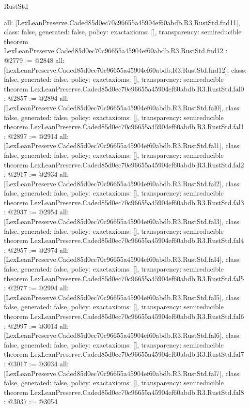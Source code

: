 \begin{lexlean}{RustStd}
\begin{coremodule}
{  all: [LexLeanPreserve.Caded85d0ec70c96655a45904ef60abdb.R3.RustStd.fnd11],
  class: false,
  generated: false,
  policy: exact{axioms: []},
  transparency: semireducible
}
theorem LexLeanPreserve.Caded85d0ec70c96655a45904ef60abdb.R3.RustStd.fnd12 : @2779 := @2848 {
  all: [LexLeanPreserve.Caded85d0ec70c96655a45904ef60abdb.R3.RustStd.fnd12],
  class: false,
  generated: false,
  policy: exact{axioms: []},
  transparency: semireducible
}
theorem LexLeanPreserve.Caded85d0ec70c96655a45904ef60abdb.R3.RustStd.fal0 : @2857 := @2894 {
  all: [LexLeanPreserve.Caded85d0ec70c96655a45904ef60abdb.R3.RustStd.fal0],
  class: false,
  generated: false,
  policy: exact{axioms: []},
  transparency: semireducible
}
theorem LexLeanPreserve.Caded85d0ec70c96655a45904ef60abdb.R3.RustStd.fal1 : @2897 := @2914 {
  all: [LexLeanPreserve.Caded85d0ec70c96655a45904ef60abdb.R3.RustStd.fal1],
  class: false,
  generated: false,
  policy: exact{axioms: []},
  transparency: semireducible
}
theorem LexLeanPreserve.Caded85d0ec70c96655a45904ef60abdb.R3.RustStd.fal2 : @2917 := @2934 {
  all: [LexLeanPreserve.Caded85d0ec70c96655a45904ef60abdb.R3.RustStd.fal2],
  class: false,
  generated: false,
  policy: exact{axioms: []},
  transparency: semireducible
}
theorem LexLeanPreserve.Caded85d0ec70c96655a45904ef60abdb.R3.RustStd.fal3 : @2937 := @2954 {
  all: [LexLeanPreserve.Caded85d0ec70c96655a45904ef60abdb.R3.RustStd.fal3],
  class: false,
  generated: false,
  policy: exact{axioms: []},
  transparency: semireducible
}
theorem LexLeanPreserve.Caded85d0ec70c96655a45904ef60abdb.R3.RustStd.fal4 : @2957 := @2974 {
  all: [LexLeanPreserve.Caded85d0ec70c96655a45904ef60abdb.R3.RustStd.fal4],
  class: false,
  generated: false,
  policy: exact{axioms: []},
  transparency: semireducible
}
theorem LexLeanPreserve.Caded85d0ec70c96655a45904ef60abdb.R3.RustStd.fal5 : @2977 := @2994 {
  all: [LexLeanPreserve.Caded85d0ec70c96655a45904ef60abdb.R3.RustStd.fal5],
  class: false,
  generated: false,
  policy: exact{axioms: []},
  transparency: semireducible
}
theorem LexLeanPreserve.Caded85d0ec70c96655a45904ef60abdb.R3.RustStd.fal6 : @2997 := @3014 {
  all: [LexLeanPreserve.Caded85d0ec70c96655a45904ef60abdb.R3.RustStd.fal6],
  class: false,
  generated: false,
  policy: exact{axioms: []},
  transparency: semireducible
}
theorem LexLeanPreserve.Caded85d0ec70c96655a45904ef60abdb.R3.RustStd.fal7 : @3017 := @3034 {
  all: [LexLeanPreserve.Caded85d0ec70c96655a45904ef60abdb.R3.RustStd.fal7],
  class: false,
  generated: false,
  policy: exact{axioms: []},
  transparency: semireducible
}
theorem LexLeanPreserve.Caded85d0ec70c96655a45904ef60abdb.R3.RustStd.fal8 : @3037 := @3054 {
}
\end{coremodule}
\end{lexlean}

